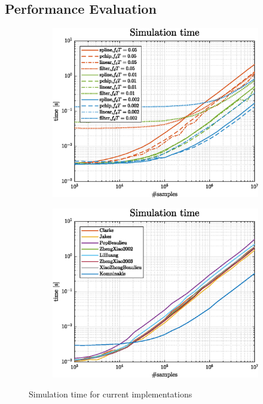 \subsection{Performance Evaluation}

\begin{figure}
	\hfill
	\begin{subfigure}[t]{.49\linewidth}
		\centering
		\includegraphics[width=\linewidth]{img/simTime_Komninakis.eps}
		\label{fig:KomninakisSimTime}
	\end{subfigure}
	\hfill
	\begin{subfigure}[t]{.49\linewidth}
		\centering
		\includegraphics[width=\linewidth]{img/simTime.eps}
		\label{fig:overallSimTime}
	\end{subfigure}
	\hfill
	
	\caption{Simulation time for current implementations}
	\label{fig:simTime}
\end{figure}

